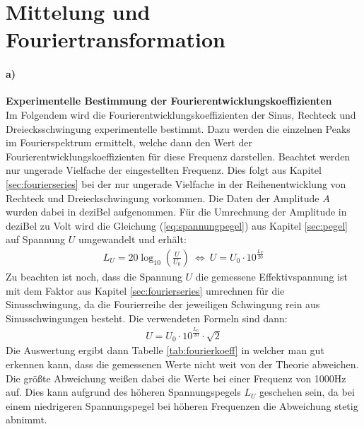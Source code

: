 
\section{Mittelung und Fouriertransformation}
\label{sec:mittelungAndTrafo}

\paragraph{a)}\textbf{Experimentelle Bestimmung der Fourierentwicklungskoeffizienten}\\
Im Folgendem wird die Fourierentwicklungskoeffizienten der Sinus, Rechteck und Dreiecksschwingung experimentelle bestimmt. Dazu werden die einzelnen Peaks im Fourierspektrum ermittelt, welche dann den Wert der Fourierentwicklungskoeffizienten für diese Frequenz darstellen. Beachtet werden nur ungerade Vielfache der eingestellten Frequenz. Dies folgt aus Kapitel \ref{sec:fourierseries} bei der nur ungerade Vielfache in der Reihenentwicklung von Rechteck und Dreieckschwingung vorkommen. Die Daten der Amplitude $A$ wurden dabei in deziBel aufgenommen. Für die Umrechnung der Amplitude in deziBel zu Volt wird die Gleichung (\ref{eq:spannungpegel}) aus Kapitel \ref{sec:pegel} auf Spannung $U$ umgewandelt und erhält:
\begin{gather}
    L_U = 20 \log_{10}\left(\frac{U}{U_0}\right)~\Leftrightarrow~U = U_0 \cdot 10^{\frac{L_U}{20}}
\end{gather}
Zu beachten ist noch, dass die Spannung $U$ die gemessene Effektivspannung ist mit dem Faktor aus Kapitel \ref{sec:fourierseries} umrechnen für die Sinusschwingung, da die Fourierreihe der jeweiligen Schwingung rein aus Sinusschwingungen besteht. Die verwendeten Formeln sind dann:
\begin{gather}
    U = U_0 \cdot 10^{\frac{L_U}{20}} \cdot \sqrt{2}    
    \label{eq:umrechnung}
\end{gather}
Die Auswertung ergibt dann Tabelle \ref{tab:fourierkoeff} in welcher man gut erkennen kann, dass die gemessenen Werte nicht weit von der Theorie abweichen. Die größte Abweichung weißen dabei die Werte bei einer Frequenz von 1000Hz auf. Dies kann aufgrund des höheren Spannungspegels $L_U$ geschehen sein, da bei einem niedrigeren Spannungspegel bei höheren Frequenzen die Abweichung stetig abnimmt.
\newpage
